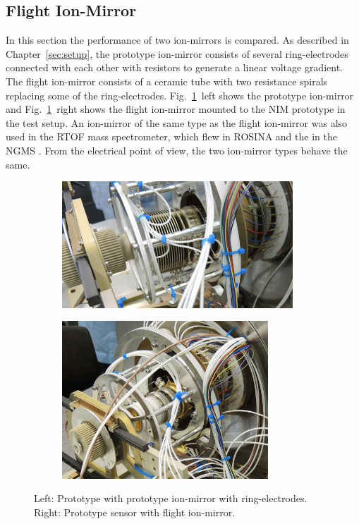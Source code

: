 	\subsection{Flight Ion-Mirror }
	In this section the performance of two ion-mirrors is compared. As described in Chapter~\ref{sec:setup}, the prototype ion-mirror consists of several ring-electrodes connected with each other with resistors to generate a linear voltage gradient. The flight ion-mirror consists of a ceramic tube with two resistance spirals replacing some of the ring-electrodes. Fig.~\ref{fig:ExpRefl}~left shows the prototype ion-mirror and Fig.~\ref{fig:ExpRefl}~right shows the flight ion-mirror mounted to the NIM prototype in the test setup. An ion-mirror of the same type as the flight ion-mirror was also used in the RTOF mass spectrometer, which flew in ROSINA \cite{Diss_Scherer} and the in the NGMS \cite{Diss_Hofer}. From the electrical point of view, the two ion-mirror types behave the same.\\
	\begin{figure}[H]
		\begin{subfigure}{0.5\textwidth}
			\centering
			\includegraphics[width = 0.95\textwidth]{Experiments/reflectron_Prototype1.jpg}
		\end{subfigure}
		\begin{subfigure}{0.5\textwidth}
			\centering
			\includegraphics[width = 0.85\textwidth]{Experiments/reflectron_flight.JPG}
		\end{subfigure}
		\caption{Left: Prototype with prototype ion-mirror with ring-electrodes. Right: Prototype sensor with flight ion-mirror.}
		\label{fig:ExpRefl}
	\end{figure}

